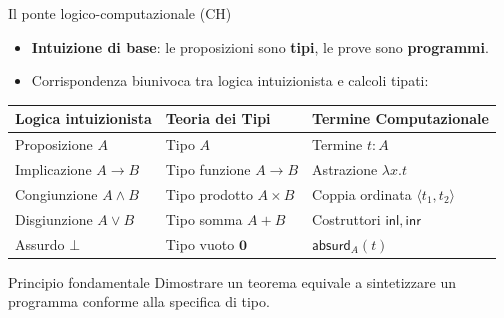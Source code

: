 
\begin{frame}{Il ponte logico-computazionale (CH)}
    \begin{itemize}
        \item \textbf{Intuizione di base}: le proposizioni sono \textbf{tipi}, le prove sono \textbf{programmi}.
        \item Corrispondenza biunivoca tra logica intuizionista e calcoli tipati:
    \end{itemize}

    \vskip 0.30cm
    \begin{table}
        \centering
        \small
        \begin{tabular}{lll}
            \toprule
                \textbf{Logica intuizionista} & \textbf{Teoria dei Tipi}   & \textbf{Termine Computazionale}              \\
            \midrule
                Proposizione $A$              & Tipo $A$                   & Termine $t : A$                              \\
                Implicazione $A \to B$        & Tipo funzione $A \to B$    & Astrazione $\lambda x. t$                    \\
                Congiunzione $A \land B$      & Tipo prodotto $A \times B$ & Coppia ordinata $\langle t_1, t_2 \rangle$   \\
                Disgiunzione $A \lor B$       & Tipo somma $A + B$         & Costruttori $\mathsf{inl}, \mathsf{inr}$     \\
                Assurdo $\bot$                & Tipo vuoto $\mathbf{0}$    & $\mathsf{absurd}_A(t)$                       \\
            \bottomrule
        \end{tabular}
    \end{table}

    \vskip 0.20cm
    \noindent
    \begin{block}{Principio fondamentale}
        Dimostrare un teorema equivale a sintetizzare un programma conforme alla specifica di tipo.
    \end{block}
\end{frame}

